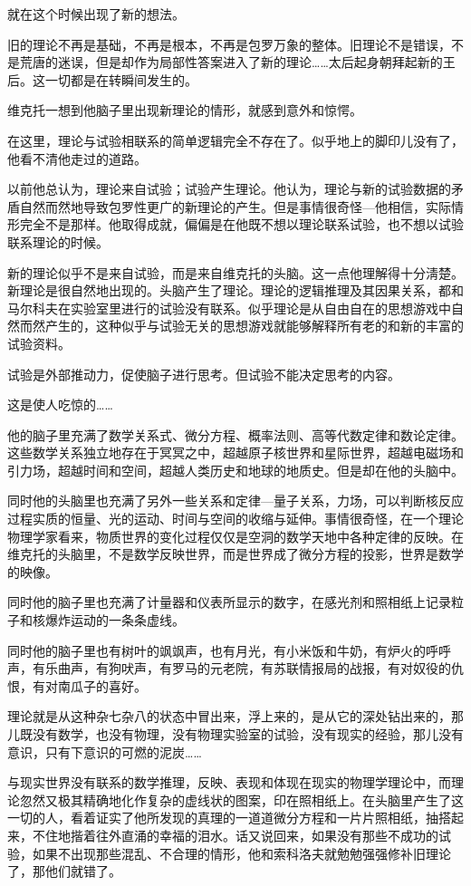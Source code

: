 就在这个时候出现了新的想法。

旧的理论不再是基础，不再是根本，不再是包罗万象的整体。旧理论不是错误，不是荒唐的迷误，但是却作为局部性答案进入了新的理论……太后起身朝拜起新的王后。这一切都是在转瞬间发生的。

维克托一想到他脑子里出现新理论的情形，就感到意外和惊愕。

在这里，理论与试验相联系的简单逻辑完全不存在了。似乎地上的脚印儿没有了，他看不清他走过的道路。

以前他总认为，理论来自试验；试验产生理论。他认为，理论与新的试验数据的矛盾自然而然地导致包罗性更广的新理论的产生。但是事情很奇怪—他相信，实际情形完全不是那样。他取得成就，偏偏是在他既不想以理论联系试验，也不想以试验联系理论的时候。

新的理论似乎不是来自试验，而是来自维克托的头脑。这一点他理解得十分淸楚。新理论是很自然地出现的。头脑产生了理论。理论的逻辑推理及其因果关系，都和马尔科夫在实验室里进行的试验没有联系。似乎理论是从自由自在的思想游戏中自然而然产生的，这种似乎与试验无关的思想游戏就能够解释所有老的和新的丰富的试验资料。

试验是外部推动力，促使脑子进行思考。但试验不能决定思考的内容。

这是使人吃惊的……

他的脑子里充满了数学关系式、微分方程、概率法则、高等代数定律和数论定律。这些数学关系独立地存在于冥冥之中，超越原子核世界和星际世界，超越电磁场和引力场，超越时间和空间，超越人类历史和地球的地质史。但是却在他的头脑中。

同时他的头脑里也充满了另外一些关系和定律—量子关系，力场，可以判断核反应过程实质的恒量、光的运动、时间与空间的收缩与延伸。事情很奇怪，在一个理论物理学家看来，物质世界的变化过程仅仅是空洞的数学天地中各种定律的反映。在维克托的头脑里，不是数学反映世界，而是世界成了微分方程的投影，世界是数学的映像。

同时他的脑子里也充满了计量器和仪表所显示的数字，在感光剂和照相纸上记录粒子和核爆炸运动的一条条虚线。

同时他的脑子里也有树叶的飒飒声，也有月光，有小米饭和牛奶，有炉火的呼呼声，有乐曲声，有狗吠声，有罗马的元老院，有苏联情报局的战报，有对奴役的仇恨，有对南瓜子的喜好。

理论就是从这种杂七杂八的状态中冒出来，浮上来的，是从它的深处钻出来的，那儿既没有数学，也没有物理，没有物理实验室的试验，没有现实的经验，那儿没有意识，只有下意识的可燃的泥炭……

与现实世界没有联系的数学推理，反映、表现和体现在现实的物理学理论中，而理论忽然又极其精确地化作复杂的虚线状的图案，印在照相纸上。在头脑里产生了这一切的人，看着证实了他所发现的真理的一道道微分方程和一片片照相纸，抽搭起来，不住地揩着往外直涌的幸福的泪水。话又说回来，如果没有那些不成功的试验，如果不出现那些混乱、不合理的情形，他和索科洛夫就勉勉强强修补旧理论了，那他们就错了。

